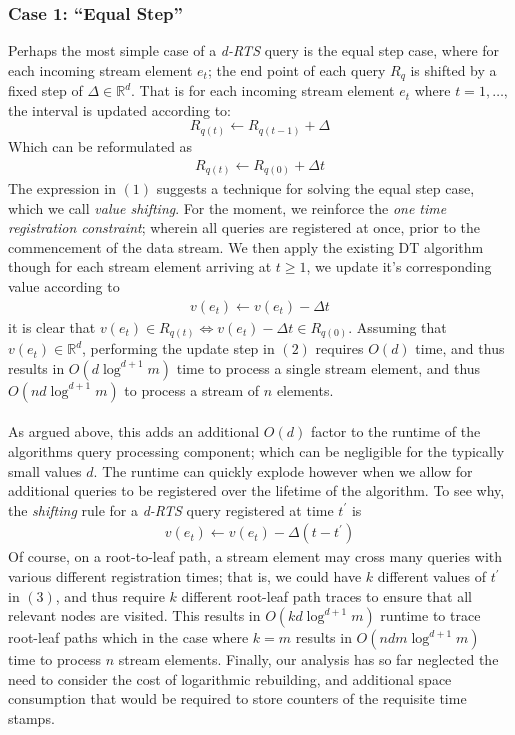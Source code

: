 \documentclass{article}
\begin{document}
\subsubsection*{Case 1: ``Equal Step''}
Perhaps the most simple case of a \textit{d-RTS} query is the equal step case, where for each incoming stream element $e_t$; the end point of each query $R_q$ is shifted by a fixed step of $\Delta\in\mathbb{R}^d$. That is for each incoming stream element $e_t$ where $t = 1,\dots,$ the interval is updated according to: 
$$R_{q(t)} \leftarrow R_{q(t-1)} + \Delta$$
Which can be reformulated as 
\begin{align}
    R_{q(t)} \leftarrow R_{q(0)} + \Delta t
\end{align}
The expression in $(1)$ suggests a technique for solving the equal step case, which we call \textit{value shifting}. For the moment, we reinforce the \textit{one time registration constraint}; wherein all queries are registered at once, prior to the commencement of the data stream. We then apply the existing DT algorithm though for each stream element arriving at $t\geq1$, we update it's corresponding value according to 
\begin{align}
    v(e_t) \leftarrow v(e_t) - \Delta t
\end{align}
it is clear that $v(e_t) \in R_{q(t)} \iff v(e_t)-\Delta t \in R_{q(0)}$. Assuming that $v(e_t)\in\mathbb{R}^d$, performing the update step in $(2)$ requires $O(d)$ time, and thus results in $O(d\log^{d+1}m)$ time to process a single stream element, and thus $O(nd\log^{d+1}m)$ to process a stream of $n$ elements. \\
\\
As argued above, this adds an additional $O(d)$ factor to the runtime of the algorithms query processing component; which can be negligible for the typically small values $d$. The runtime can quickly explode however when we allow for additional queries to be registered over the lifetime of the algorithm. To see why, the \textit{shifting} rule for a \textit{d-RTS} query registered at time $t^\prime$ is
\begin{align}
    v(e_t) \leftarrow v(e_t) - \Delta(t - t^\prime)
\end{align}
Of course, on a root-to-leaf path, a stream element may cross many queries with various different registration times; that is, we could have $k$ different values of $t^\prime$ in $(3)$, and thus require $k$ different root-leaf path traces to ensure that all relevant nodes are visited. This results in $O(kd\log^{d+1}m)$ runtime to trace root-leaf paths which in the case where $k=m$ results in $O(ndm\log^{d+1}m)$ time to process $n$ stream elements. Finally, our analysis has so far neglected the need to consider the cost of logarithmic rebuilding, and additional space consumption that would be required to store counters of the requisite time stamps.\\
\end{document}

